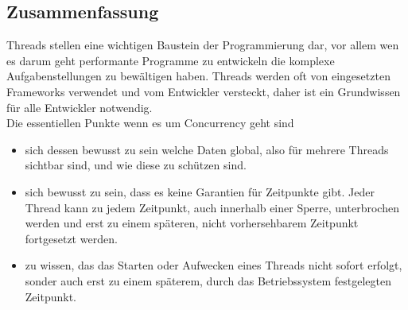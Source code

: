 \subsection{Zusammenfassung}
Threads stellen eine wichtigen Baustein der Programmierung dar, vor allem wen es darum geht performante Programme zu entwickeln die komplexe Aufgabenstellungen zu bewältigen haben. Threads werden oft von eingesetzten Frameworks verwendet und vom Entwickler versteckt, daher ist ein Grundwissen für alle Entwickler notwendig. 
\\Die essentiellen Punkte wenn es um Concurrency geht sind
\begin{itemize}
	\item sich dessen bewusst zu sein welche Daten global, also für mehrere Threads sichtbar sind, und wie diese zu schützen sind. 
	\item sich bewusst zu sein, dass es keine Garantien für Zeitpunkte gibt. Jeder Thread kann zu jedem Zeitpunkt, auch innerhalb einer Sperre, unterbrochen werden und erst zu einem späteren, nicht vorhersehbarem Zeitpunkt fortgesetzt werden.
	\item zu wissen, das das Starten oder Aufwecken eines Threads nicht sofort erfolgt, sonder auch erst zu einem späterem, durch das Betriebssystem festgelegten Zeitpunkt.
\end{itemize}


